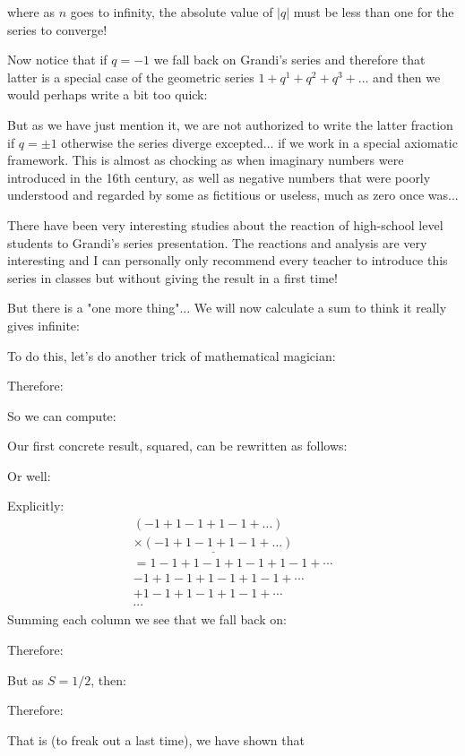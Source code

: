 	where as $n$ goes to infinity, the absolute value of $|q|$ must be less than one for the series to converge!

	Now notice that if $q=-1$ we fall back on Grandi's series and therefore that latter is a special case of the geometric series $1+q^1+q^2+q^3+\ldots$ and then we would perhaps write a bit too quick:
	
	But as we have just mention it, we are not authorized to write the latter fraction if $q=\pm 1$ otherwise the series diverge excepted... if we work in a special axiomatic framework. This is almost as chocking as when imaginary numbers were introduced in the 16th century, as well as negative numbers that were poorly understood and regarded by some as fictitious or useless, much as zero once was...
	\begin{tcolorbox}[title=Remark,colframe=black,arc=10pt]
	There have been very interesting studies about the reaction of high-school level students to Grandi's series presentation. The reactions and analysis are very interesting and I can personally only recommend every teacher to introduce this series in classes but without giving the result in a first time!
	\end{tcolorbox}
	But there is a "one more thing"... We will now calculate a sum to think it really gives infinite:
	
	To do this, let's do another trick of mathematical magician:
	
	Therefore:
	
	So we can compute:
	
	Our first concrete result, squared, can be rewritten as follows:

	
	Or well:
	
	Explicitly:
   \begin{eqnarray*}
	   (-1 + 1-1 + 1-1 + \ldots)\\
	   \underline{\times (-1 + 1-1 + 1-1 + \ldots)} \\
	    =1-1 + 1-1 + 1-1 + 1-1 + \cdots \\ -1 + 1-1 + 1-1 + 1-1 + \cdots\\ + 1-1 + 1-1 + 1-1 + \cdots\\ \cdots
	\end{eqnarray*}
	Summing each column we see that we fall back on:
   
	Therefore:
	
   But as $S = 1/2$, then:
   
   Therefore:
   
   That is (to freak out a last time), we have shown that
   
